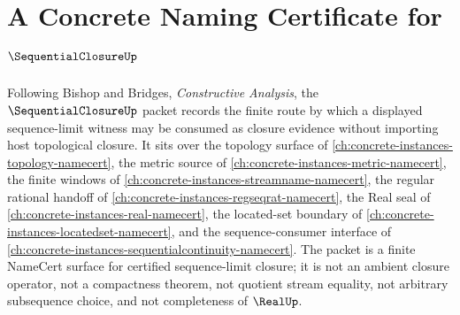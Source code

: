 \chapter{A Concrete Naming Certificate for $\SequentialClosureUp$}
\label{ch:concrete-instances-sequentialclosure-namecert}

Following Bishop and Bridges, \emph{Constructive Analysis}, the $\SequentialClosureUp$ packet records the finite route by which a displayed sequence-limit witness may be consumed as closure evidence without importing host topological closure. It sits over the topology surface of \autoref{ch:concrete-instances-topology-namecert}, the metric source of \autoref{ch:concrete-instances-metric-namecert}, the finite windows of \autoref{ch:concrete-instances-streamname-namecert}, the regular rational handoff of \autoref{ch:concrete-instances-regseqrat-namecert}, the Real seal of \autoref{ch:concrete-instances-real-namecert}, the located-set boundary of \autoref{ch:concrete-instances-locatedset-namecert}, and the sequence-consumer interface of \autoref{ch:concrete-instances-sequentialcontinuity-namecert}. The packet is a finite NameCert surface for certified sequence-limit closure; it is not an ambient closure operator, not a compactness theorem, not quotient stream equality, not arbitrary subsequence choice, and not completeness of $\RealUp$.

